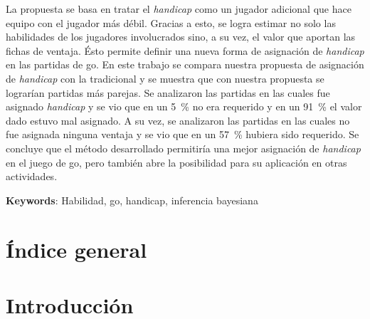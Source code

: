 \documentclass[11pt,twoside,spanish]{report} %
\begin{document}
La propuesta se basa en tratar el \emph{handicap} como un jugador adicional que hace equipo con el jugador m\'as d\'ebil. 
Gracias a esto, se logra estimar no solo las habilidades de los jugadores involucrados sino, a su vez, el valor que aportan las fichas de ventaja.
\'Esto permite definir una nueva forma de asignaci\'on de \emph{handicap} en las partidas de go.
En este trabajo se compara nuestra propuesta de asignaci\'on de \emph{handicap} con la tradicional y se muestra que con nuestra propuesta se lograr\'ian partidas m\'as parejas.
Se analizaron las partidas en las cuales fue asignado \emph{handicap} y se vio que en un \SI{5}{\percent} no era requerido y en un \SI{91}{\percent} el valor dado estuvo mal asignado.
A su vez, se analizaron las partidas en las cuales no fue asignada ninguna ventaja y se vio que en un \SI{57}{\percent} hubiera sido requerido. 
Se concluye que el m\'etodo desarrollado permitir\'ia una mejor asignaci\'on de \emph{handicap} en el juego de go, pero tambi\'en abre la posibilidad para su aplicaci\'on en otras actividades.

\textbf{Keywords}: Habilidad, go, handicap, inferencia bayesiana



\newpage
\chapter*{\'Indice general} %
\vspace*{-4cm}
\tableofcontents
\thispagestyle{empty}
\vspace*{-5cm}

\cleardoublepage

\thispagestyle{plain}
\pagestyle{plain}
\setcounter{page}{1}
\chapter{Introducci\'on}




\vspace{-1cm}
%
%
\end{document}
